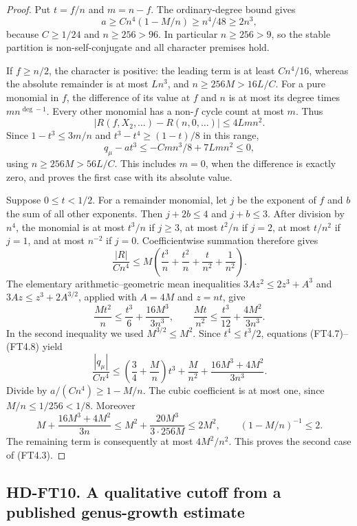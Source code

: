 \begin{proof}
Put $t=f/n$ and $m=n-f$. The ordinary-degree bound gives
\[
 a\ge Cn^4(1-M/n)\ge n^4/48\ge2n^3,
 \tag{FT4.4}
\]
because $C\ge1/24$ and $n\ge256>96$. In particular $n\ge256>9$, so the
stable partition is non-self-conjugate and all character premises hold.

If $f\ge n/2$, the character is positive: the leading term is at least
$Cn^4/16$, whereas the absolute remainder is at most $Ln^3$, and
$n\ge256M>16L/C$.
For a pure monomial in $f$, the difference of its value at $f$ and $n$
is at most its degree times $mn^{\deg-1}$. Every other monomial has a
non-$f$ cycle count at most $m$. Thus
\[
 |R(f,X_2,\ldots)-R(n,0,\ldots)|\le4Lm n^2.
 \tag{FT4.5}
\]
Since $1-t^3\le3m/n$ and $t^3-t^4\ge(1-t)/8$ in this range,
\[
 q_\mu-a t^3\le-Cmn^3/8+7Lm n^2\le0,
 \tag{FT4.6}
\]
using $n\ge256M>56L/C$. This includes $m=0$, when the difference is
exactly zero, and proves the first case with its absolute value.

Suppose $0\le t<1/2$. For a remainder monomial, let $j$ be the exponent
of $f$ and $b$ the sum of all other exponents. Then $j+2b\le4$ and
$j+b\le3$. After division by $n^4$, the monomial is at most $t^3/n$
if $j\ge3$, at most $t^2/n$ if $j=2$, at most $t/n^2$ if $j=1$,
and at most $n^{-2}$ if $j=0$. Coefficientwise summation therefore gives
\[
 \frac{|R|}{Cn^4}
 \le M\left(\frac{t^3}{n}+\frac{t^2}{n}
                       +\frac{t}{n^2}+\frac1{n^2}\right).
 \tag{FT4.7}
\]
The elementary arithmetic--geometric mean inequalities
$3Az^2\le2z^3+A^3$ and $3Az\le z^3+2A^{3/2}$, applied with
$A=4M$ and $z=nt$, give
\[
 \frac{Mt^2}{n}\le\frac{t^3}{6}+\frac{16M^3}{3n^3},
 \qquad
 \frac{Mt}{n^2}\le\frac{t^3}{12}+\frac{4M^2}{3n^3}.
 \tag{FT4.8}
\]
In the second inequality we used $M^{3/2}\le M^2$.
Since $t^4\le t^3/2$, equations (FT4.7)--(FT4.8) yield
\[
 \frac{|q_\mu|}{Cn^4}
 \le\left(\frac34+\frac Mn\right)t^3
       +\frac{M}{n^2}+\frac{16M^3+4M^2}{3n^3}.
 \tag{FT4.9}
\]
Divide by $a/(Cn^4)\ge1-M/n$.
The cubic coefficient is at most one, since $M/n\le1/256<1/8$.
Moreover
\[
 M+\frac{16M^3+4M^2}{3n}
 \le M^2+\frac{20M^3}{3\cdot256M}\le2M^2,
 \qquad (1-M/n)^{-1}\le2.
 \tag{FT4.10}
\]
The remaining term is consequently at most $4M^2/n^2$.
This proves the second case of (FT4.3).
\end{proof}

\subsection*{HD-FT10. A qualitative cutoff from a published genus-growth estimate}

